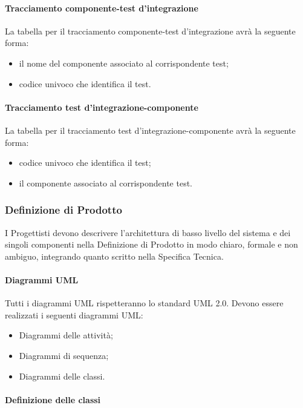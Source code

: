 \paragraph{Tracciamento componente-test d'integrazione}
La tabella per il tracciamento componente-test d'integrazione avrà la seguente forma:
\begin{itemize}
\item {} il nome del componente associato al corrispondente test;
\item {}codice univoco che identifica il test.
\end{itemize}

\paragraph{Tracciamento test d'integrazione-componente}
La tabella per il tracciamento test d'integrazione-componente avrà la seguente forma:
\begin{itemize}
\item {}codice univoco che identifica il test;
\item {} il componente associato al corrispondente test.
\end{itemize}

\subsubsection{Definizione di Prodotto}
\label{}
I Progettisti devono descrivere l'architettura di basso livello del sistema e dei singoli componenti nella Definizione di Prodotto in modo chiaro, formale e non ambiguo, integrando quanto scritto nella Specifica Tecnica.

\paragraph{Diagrammi UML}
\label{}
Tutti i diagrammi UML rispetteranno lo standard UML 2.0.
Devono essere realizzati i seguenti diagrammi UML:
\begin{itemize}
\item Diagrammi delle attività;
\item Diagrammi di sequenza;
\item Diagrammi delle classi.
\end{itemize}

\paragraph{Definizione delle classi}
\label{}


